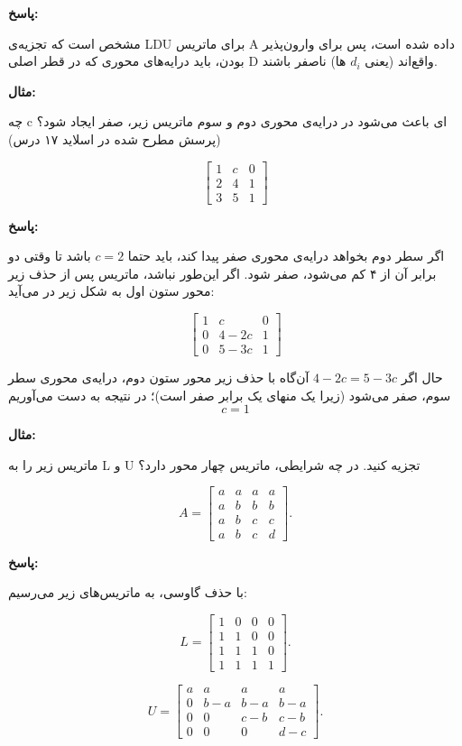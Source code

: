 \textbf{پاسخ:}

مشخص است که تجزیه‌ی LDU برای ماتریس A داده شده است، پس برای وارون‌پذیر بودن، باید درایه‌های محوری که در قطر اصلی D واقع‌اند (یعنی $d_i$ ها) ناصفر باشند.


\textbf{مثال:}

چه c ای باعث می‌شود در درایه‌ی محوری دوم و سوم ماتریس زیر، صفر ایجاد شود؟ (پرسش مطرح شده در اسلاید ۱۷ درس)

\[
\begin{bmatrix}
1 & c& 0\\
2& 4 & 1\\
3& 5 & 1
\end{bmatrix}
\]

\textbf{پاسخ:}

اگر سطر دوم بخواهد درایه‌ی محوری صفر پیدا کند، باید حتما $c = 2$ باشد تا وقتی دو برابر آن از ۴ کم می‌شود، صفر شود. اگر این‌طور نباشد، ماتریس پس از حذف زیر محور ستون اول به شکل زیر در می‌آید:

\[
\begin{bmatrix}
1 & c& 0\\
0& 4 - 2c & 1\\
0& 5 - 3c & 1
\end{bmatrix}
\]

حال اگر $4 - 2c = 5 - 3c$ آن‌گاه با حذف زیر محور ستون دوم، درایه‌ی محوری سطر سوم، صفر می‌شود (زیرا یک منهای یک برابر صفر است)؛ در نتیجه به دست می‌آوریم 
$$ c = 1$$


\textbf{مثال:}

ماتریس زیر را به L و U تجزیه کنید. در چه شرایطی، ماتریس چهار محور دارد؟

\[A=
\begin{bmatrix}
a & a& a & a\\
a & b& b & b\\
a & b& c & c\\
a & b& c & d
\end{bmatrix}.
\]

\textbf{پاسخ:}

با حذف گاوسی، به ماتریس‌های زیر می‌رسیم:

\[L=
\begin{bmatrix}
1 & 0& 0 & 0\\
1 & 1& 0 & 0\\
1 & 1& 1 & 0\\
1 & 1& 1 & 1
\end{bmatrix}.
\]


\[U=
\begin{bmatrix}
a & a& a & a\\
0 & b-a& b-a & b-a\\
0 & 0& c-b & c-b\\
0 & 0& 0 & d-c
\end{bmatrix}.
\]
\\

